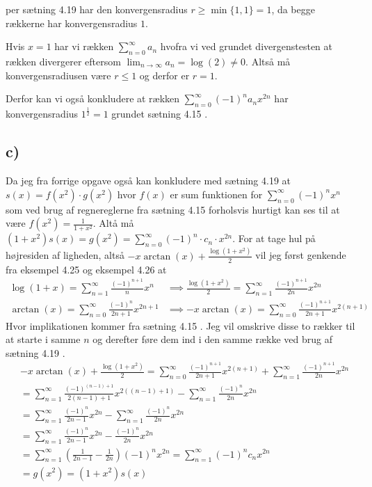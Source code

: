 \documentclass{article}
\newcommand{\lr}[1]{\left( #1\right)}
\begin{document}
per sætning 4.19 har den konvergensradius $r \ge \min\{1,1\} = 1$, da begge rækkerne har konvergensradius $1$.

Hvis $x = 1$ har vi rækken $\sum_{n=0}^{\infty} a_n$ hvofra vi ved grundet
divergenstesten \cite[sætning 2.2]{an1} at rækken divergerer eftersom $\lim_{n \to \infty} a_n = \log(2) \neq 0$.
Altså må konvergensradiusen være $r \le 1$ og derfor er $r=1$.

Derfor kan vi også konkludere at rækken $\sum_{n=0}^{\infty} (-1)^n a_n x^{2n}$ 
har konvergensradius $1^{\frac{1}{2}} = 1$ grundet sætning 4.15 \cite{an1}.

\subsection*{c)}
Da jeg fra forrige opgave også kan konkludere med sætning 4.19 at $s(x) = f(x^2) \cdot g(x^2)$
hvor $f(x)$ er sum funktionen for $\sum_{n=0}^{\infty} (-1)^n x^n$ som ved brug af regnereglerne fra sætning 4.15 \cite{an1}
forholsvis hurtigt kan ses til at være $f(x^2) = \frac{1}{1+x^2}$.
Altå må $(1+x^2)s(x) = g(x^2) = \sum_{n=0}^{\infty} (-1)^n \cdot c_n \cdot  x^{2n}$.
For at tage hul på højresiden af ligheden, altså $-x \arctan(x) + \frac{\log(1+x^2)}{2}$ vil jeg først genkende 
fra eksempel 4.25 og eksempel 4.26 \cite{an1} at
\begin{align*}
    \log(1+x) = \sum_{n=1}^{\infty} \frac{(-1)^{n+1}}{n} x^n &\implies
    \frac{\log(1+x^2)}{2} = \sum_{n=1}^{\infty} \frac{(-1)^{n+1}}{2n} x^{2n} \\
    \arctan(x) = \sum_{n=0}^{\infty} \frac{(-1)^{n}}{2n+1} x^{2n+1} &\implies
    -x\arctan(x) = \sum_{n=0}^{\infty} \frac{(-1)^{n+1}}{2n+1} x^{2(n+1)}
\end{align*}
Hvor implikationen kommer fra sætning 4.15 \cite{an1}.
Jeg vil omskrive disse to rækker til at starte i samme $n$ og derefter føre 
dem ind i den samme række ved brug af sætning 4.19 \cite{an1}.
\begin{align*}
&-x\arctan(x) + \frac{\log(1+x^2)}{2} 
= \sum_{n=0}^{\infty} \frac{(-1)^{n+1}}{2n+1} x^{2(n+1)} + \sum_{n=1}^{\infty} \frac{(-1)^{n+1}}{2n} x^{2n} \\
&= \sum_{n=1}^{\infty} \frac{(-1)^{(n-1)+1}}{2(n-1)+1} x^{2((n-1)+1)} - \sum_{n=1}^{\infty} \frac{(-1)^{n}}{2n} x^{2n} \\
&= \sum_{n=1}^{\infty} \frac{(-1)^{n}}{2n-1} x^{2n} - \sum_{n=1}^{\infty} \frac{(-1)^{n}}{2n} x^{2n} \\
&= \sum_{n=1}^{\infty} \frac{(-1)^{n}}{2n-1} x^{2n} - \frac{(-1)^{n}}{2n} x^{2n} \\
&= \sum_{n=1}^{\infty} \lr{\frac{1}{2n-1} - \frac{1}{2n}} (-1)^{n} x^{2n} 
= \sum_{n=1}^{\infty} (-1)^{n} c_n x^{2n} \\
&= g(x^2) = (1 + x^2) s(x)
\end{align*}
\end{document}
